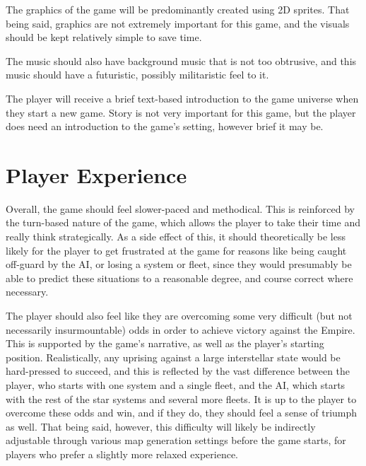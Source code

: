 \documentclass[10pt]{article}
\begin{document}
The graphics of the game will be predominantly created using 2D sprites. That being said,
graphics are not extremely important for this game, and the visuals should be kept relatively simple
to save time.

The music should also have background music that is not too obtrusive, and this music should have
a futuristic, possibly militaristic feel to it.

The player will receive a brief text-based introduction to the game universe when they start a new game.
Story is not very important for this game, but the player does need an introduction to the game's setting,
however brief it may be.

\section{Player Experience}

Overall, the game should feel slower-paced and methodical. This is reinforced by the turn-based nature of the game,
which allows the player to take their time and really think strategically. As a side effect of this, it should
theoretically be less likely for the player to get frustrated at the game for reasons like being caught off-guard
by the AI, or losing a system or fleet, since they would presumably be able to predict these situations to a reasonable degree,
and course correct where necessary.

\pagebreak

The player should also feel like they are overcoming some very difficult (but not necessarily insurmountable) odds in order to
achieve victory against the Empire. This is supported by the game's narrative, as well as the player's starting position.
Realistically, any uprising against a large interstellar state would be hard-pressed to succeed, and this is reflected by
the vast difference between the player, who starts with one system and a single fleet, and the AI, which starts with the rest of
the star systems and several more fleets. It is up to the player to overcome these odds and win, and if they do, they should
feel a sense of triumph as well. That being said, however, this difficulty will likely be indirectly adjustable through various
map generation settings before the game starts, for players who prefer a slightly more relaxed experience.

\end{document}

